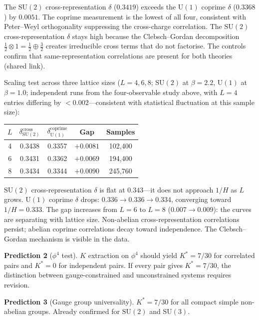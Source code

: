 \documentclass[11pt,a4paper]{article}
\theoremstyle{definition}
\theoremstyle{remark}
\newcommand{\SU}{\mathrm{SU}}
\begin{document}
The $\SU(2)$ cross-representation $\delta$ ($0.3419$) exceeds the $\mathrm{U}(1)$ coprime $\delta$ ($0.3368$) by $0.0051$. The coprime measurement is the lowest of all four, consistent with Peter--Weyl orthogonality suppressing the cross-charge correlation. The $\SU(2)$ cross-representation $\delta$ stays high because the Clebsch--Gordan decomposition $\frac{1}{2}\otimes 1=\frac{1}{2}\oplus\frac{3}{2}$ creates irreducible cross terms that do not factorise. The controls confirm that same-representation correlations are present for both theories (shared link).

Scaling test across three lattice sizes ($L=4,6,8$; $\SU(2)$ at $\beta=2.2$, $\mathrm{U}(1)$ at $\beta=1.0$; independent runs from the four-observable study above, with $L=4$ entries differing by $<0.002$---consistent with statistical fluctuation at this sample size):

\begin{center}
\begin{tabular}{ccccc}
\toprule
$L$ & $\delta_{\SU(2)}^{\mathrm{cross}}$ & $\delta_{\mathrm{U}(1)}^{\mathrm{coprime}}$ & Gap & Samples \\
\midrule
4 & 0.3438 & 0.3357 & $+0.0081$ & 102{,}400 \\
6 & 0.3431 & 0.3362 & $+0.0069$ & 194{,}400 \\
8 & 0.3434 & 0.3344 & $+0.0090$ & 245{,}760 \\
\bottomrule
\end{tabular}
\end{center}

$\SU(2)$ cross-representation $\delta$ is flat at $0.343$---it does not approach $1/H$ as $L$ grows. $\mathrm{U}(1)$ coprime $\delta$ drops: $0.336\to 0.336\to 0.334$, converging toward $1/H=0.333$. The gap increases from $L=6$ to $L=8$ ($0.007\to 0.009$): the curves are separating with lattice size. Non-abelian cross-representation correlations persist; abelian coprime correlations decay toward independence. The Clebsch--Gordan mechanism is visible in the data.

\textbf{Prediction 2} ($\phi^4$ test). $K$ extraction on $\phi^4$ should yield $K^*=7/30$ for correlated pairs and $K^*=0$ for independent pairs. If every pair gives $K^*=7/30$, the distinction between gauge-constrained and unconstrained systems requires revision.

\textbf{Prediction 3} (Gauge group universality). $K^*=7/30$ for all compact simple non-abelian groups. Already confirmed for $\SU(2)$ and $\SU(3)$.
\end{document}
